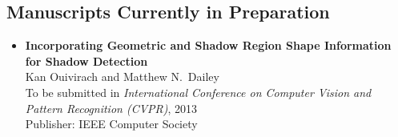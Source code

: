 \begin{itemize}
\DIFdelbegin %


\subsection*{}



\textit{}%
\DIFdelend 

\end{itemize}

\subsection*{Manuscripts Currently in Preparation}

\begin{itemize}
  \renewcommand\labelitemi{--}

  \item {\bf{Incorporating Geometric and Shadow Region Shape
    Information for Shadow Detection}}\\ Kan Ouivirach and Matthew N.\
    Dailey\\ To be submitted in \textit{International Conference on
    Computer Vision and Pattern Recognition (CVPR)}, 2013\\ Publisher:
    IEEE Computer Society

\end{itemize}

